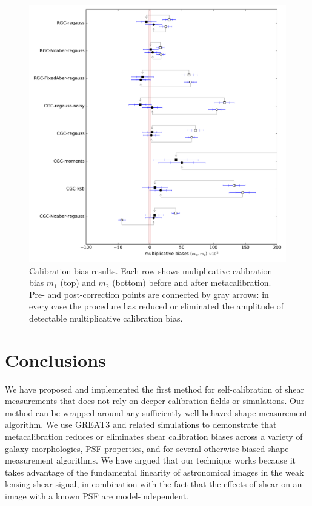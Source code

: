 \documentclass[iop]{emulateapj}
\begin{document}
\begin{figure}[t]
\begin{center}
\includegraphics[width=0.8\linewidth]{m_results_linear.pdf}
\end{center}
\caption{Calibration bias results. Each row shows muliplicative
  calibration bias $m_1$ (top) and $m_2$ (bottom) before and after
  metacalibration. Pre- and post-correction points are connected by
  gray arrows: in every case the procedure has reduced or eliminated
  the amplitude of detectable multiplicative calibration bias.}
\label{fig:m_results}
\end{figure}

\section{Conclusions}
We have proposed and implemented the first method for self-calibration
of shear measurements that does not rely on deeper calibration fields or
simulations. Our method can be wrapped around
any sufficiently well-behaved shape measurement algorithm.  We use
GREAT3 and related simulations to demonstrate that metacalibration
reduces or eliminates shear calibration biases across a variety of
galaxy morphologies, PSF properties, and for several otherwise biased
shape measurement algorithms. We have argued that our technique works
because it takes advantage of the fundamental linearity of
astronomical images in the weak lensing shear signal, in
combination with the fact that the effects of shear on an image with a
known PSF are model-independent.
\end{document}
